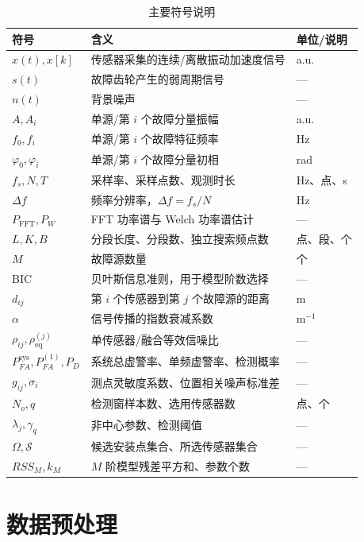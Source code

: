 \documentclass[withoutpreface,bwprint]{cumcmthesis}
\begin{document}
\begin{table}[H]
\centering
\small
\setlength{\tabcolsep}{4pt}
\renewcommand{\arraystretch}{1.08}
\caption{主要符号说明}
\label{tab:symbols}
\begin{tabular}{>{\centering\arraybackslash}m{3.2cm} m{7.5cm} >{\centering\arraybackslash}m{3cm}}
\toprule
符号 & 含义 & 单位/说明 \\
\midrule
\(x(t),x[k]\) & 传感器采集的连续/离散振动加速度信号 & a.u. \\
\(s(t)\) & 故障齿轮产生的弱周期信号 & — \\
\(n(t)\) & 背景噪声 & — \\
\(A,A_i\) & 单源/第 \(i\) 个故障分量振幅 & a.u. \\
\(f_0,f_i\) & 单源/第 \(i\) 个故障特征频率 & Hz \\
\(\varphi_0,\varphi_i\) & 单源/第 \(i\) 个故障分量初相 & rad \\
\(f_s,N,T\) & 采样率、采样点数、观测时长 & Hz、点、s \\
\(\Delta f\) & 频率分辨率，\(\Delta f=f_s/N\) & Hz \\
\(P_{\mathrm{FFT}},P_W\) & FFT 功率谱与 Welch 功率谱估计 & — \\
\(L,K,B\) & 分段长度、分段数、独立搜索频点数 & 点、段、个 \\
\(M\) & 故障源数量 & 个 \\
\(\mathrm{BIC}\) & 贝叶斯信息准则，用于模型阶数选择 & — \\
\(d_{ij}\) & 第 \(i\) 个传感器到第 \(j\) 个故障源的距离 & m \\
\(\alpha\) & 信号传播的指数衰减系数 & \(\mathrm{m}^{-1}\) \\
\(\rho_{ij},\rho^{(j)}_{\mathrm{eq}}\) & 单传感器/融合等效信噪比 & — \\
\(P_{FA}^{\mathrm{sys}},P_{FA}^{(1)},P_D\) & 系统总虚警率、单频虚警率、检测概率 & — \\
\(g_{ij},\sigma_i\) & 测点灵敏度系数、位置相关噪声标准差 & — \\
\(N_o,q\) & 检测窗样本数、选用传感器数 & 点、个 \\
\(\lambda_j,\gamma_q\) & 非中心参数、检测阈值 & — \\
\(\Omega,\mathcal S\) & 候选安装点集合、所选传感器集合 & — \\
\(RSS_M,k_M\) & \(M\) 阶模型残差平方和、参数个数 & — \\
\bottomrule
\end{tabular}
\end{table}

\section{数据预处理}
\end{document}
